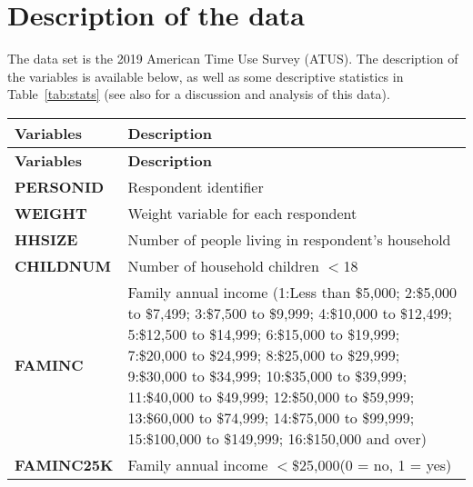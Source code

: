 \documentclass[12pt,a4paper]{article}
\begin{document}



\appendix

\section{Description of the data}
\label{sec:appendix}

The data set is the 2019 American Time Use Survey (ATUS). The
description of the variables is available below, as well as some
descriptive statistics in Table~\vref{tab:stats} (see also  \cite{WangYe24} for a discussion and analysis of this data).

\begin{longtable}{|p{}|p{}|}
  \hline
  \textbf{Variables} & \textbf{Description} \\
  \hline
  \endfirsthead

  \hline
   \textbf{Variables} & \textbf{Description} \\
  \hline
  \endhead

  \hline
  \endfoot

  \hline
  \endlastfoot

\textbf{PERSONID} &

Respondent identifier\\

\textbf{WEIGHT} &

Weight variable for each respondent \\

\textbf{HHSIZE} &

Number of people living in respondent's household \\

\textbf{CHILDNUM} &

Number of household children $<$18 \\

\textbf{FAMINC} &

Family annual income (1:Less than \$5,000; 2:\$5,000 to \$7,499; 3:\$7,500 to \$9,999; 4:\$10,000 to \$12,499;
  5:\$12,500 to \$14,999; 6:\$15,000 to \$19,999; 7:\$20,000 to \$24,999; 8:\$25,000 to \$29,999; 9:\$30,000
  to \$34,999; 10:\$35,000 to \$39,999; 11:\$40,000 to \$49,999; 12:\$50,000 to \$59,999; 13:\$60,000 to
  \$74,999; 14:\$75,000 to \$99,999; 15:\$100,000 to \$149,999; 16:\$150,000 and over) \\

\textbf{FAMINC25K} &

Family annual income $<$\$25,000(0 = no, 1 = yes) \\


\end{longtable}
\end{document}

